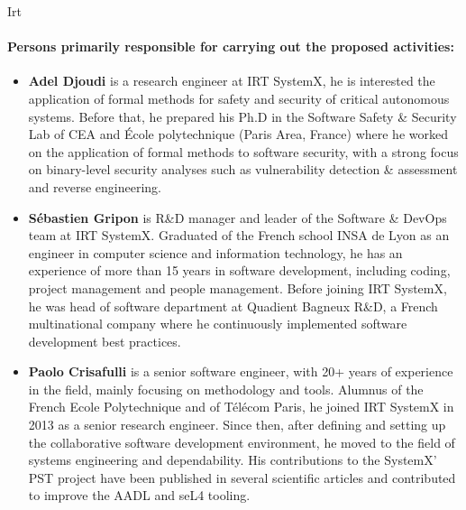 \begin{sitedescription}{Irt}
\paragraph{Persons primarily responsible for carrying out the proposed activities:}

\begin{itemize} %

\item{\bf Adel Djoudi} is a research engineer at IRT SystemX, he is interested the application of formal methods for safety and security of critical autonomous systems. Before that, he prepared his Ph.D in the Software Safety \& Security Lab of CEA and École polytechnique (Paris Area, France) where he worked on the application of formal methods to software security, with a strong focus on binary-level security analyses such as vulnerability detection \& assessment and reverse engineering.

\item{\bf Sébastien Gripon} is R\&D manager and leader of the Software \& DevOps team at IRT SystemX. Graduated of the French school INSA de Lyon as an engineer in computer science and information technology, he has an experience of more than 15 years in software development, including coding, project management and people management. Before joining IRT SystemX, he was head of software department at Quadient Bagneux R\&D, a French multinational company where he continuously implemented software development best practices.

\item{\bf Paolo Crisafulli} is a senior software engineer, with 20+ years of experience in the field, mainly focusing on methodology and tools. Alumnus of the French Ecole Polytechnique and of Télécom Paris, he joined IRT SystemX in 2013 as a senior research engineer. Since then, after defining and setting up the collaborative software development environment, he moved to the field of systems engineering and dependability. His contributions to the SystemX’ PST project have been published in several scientific articles and contributed to improve the AADL and seL4 tooling.

\end{itemize}

\end{sitedescription}

